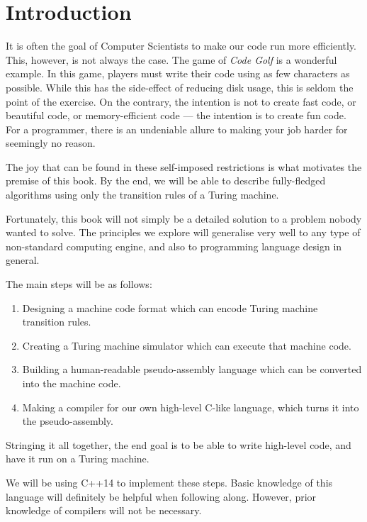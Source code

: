 \chapter{Introduction}

It is often the goal of Computer Scientists to make our code run more efficiently. This, however, is not always the case. The game of \textit{Code Golf} is a wonderful example. In this game, players must write their code using as few characters as possible. While this has the side-effect of reducing disk usage, this is seldom the point of the exercise. On the contrary, the intention is not to create fast code, or beautiful code, or memory-efficient code --- the intention is to create fun code. For a programmer, there is an undeniable allure to making your job harder for seemingly no reason.

The joy that can be found in these self-imposed restrictions is what motivates the premise of this book. By the end, we will be able to describe fully-fledged algorithms using only the transition rules of a Turing machine.

Fortunately, this book will not simply be a detailed solution to a problem nobody wanted to solve. The principles we explore will generalise very well to any type of non-standard computing engine, and also to programming language design in general. 

The main steps will be as follows:
\begin{enumerate}
    \item Designing a machine code format which can encode Turing machine transition rules.
    \item Creating a Turing machine simulator which can execute that machine code.
    \item Building a human-readable pseudo-assembly language which can be converted into the machine code.
    \item Making a compiler for our own high-level C-like language, which turns it into the pseudo-assembly.
\end{enumerate}

Stringing it all together, the end goal is to be able to write high-level code, and have it run on a Turing machine.

We will be using C++14 to implement these steps. Basic knowledge of this language will definitely be helpful when following along. However, prior knowledge of compilers will not be necessary.
